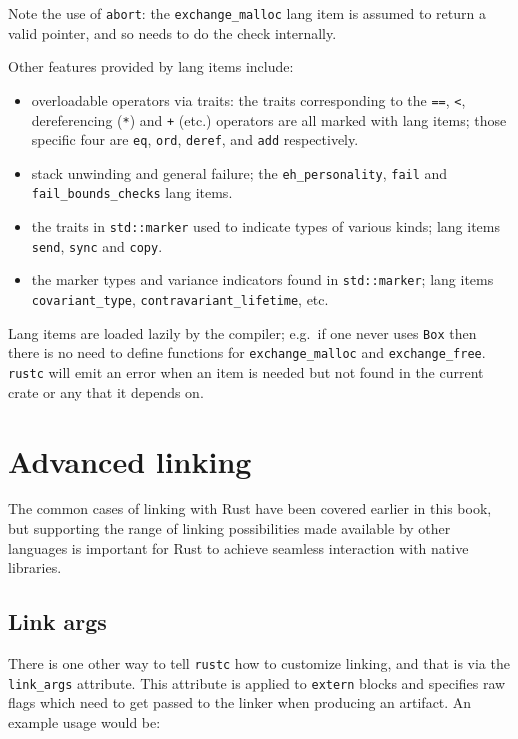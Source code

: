 \documentclass[a4paper,]{book}
\providecommand{\tightlist}{%
  \setlength{\itemsep}{0pt}\setlength{\parskip}{0pt}}
\begin{document}
Note the use of \texttt{abort}: the \texttt{exchange\_malloc} lang item
is assumed to return a valid pointer, and so needs to do the check
internally.

Other features provided by lang items include:

\begin{itemize}
\tightlist
\item
  overloadable operators via traits: the traits corresponding to the
  \texttt{==}, \texttt{\textless{}}, dereferencing (\texttt{*}) and
  \texttt{+} (etc.) operators are all marked with lang items; those
  specific four are \texttt{eq}, \texttt{ord}, \texttt{deref}, and
  \texttt{add} respectively.
\item
  stack unwinding and general failure; the \texttt{eh\_personality},
  \texttt{fail} and \texttt{fail\_bounds\_checks} lang items.
\item
  the traits in \texttt{std::marker} used to indicate types of various
  kinds; lang items \texttt{send}, \texttt{sync} and \texttt{copy}.
\item
  the marker types and variance indicators found in
  \texttt{std::marker}; lang items \texttt{covariant\_type},
  \texttt{contravariant\_lifetime}, etc.
\end{itemize}

Lang items are loaded lazily by the compiler; e.g.~if one never uses
\texttt{Box} then there is no need to define functions for
\texttt{exchange\_malloc} and \texttt{exchange\_free}. \texttt{rustc}
will emit an error when an item is needed but not found in the current
crate or any that it depends on.

\section{Advanced linking}\label{sec--advanced-linking}

The common cases of linking with Rust have been covered earlier in this
book, but supporting the range of linking possibilities made available
by other languages is important for Rust to achieve seamless interaction
with native libraries.

\subsection{Link args}\label{link-args}

There is one other way to tell \texttt{rustc} how to customize linking,
and that is via the \texttt{link\_args} attribute. This attribute is
applied to \texttt{extern} blocks and specifies raw flags which need to
get passed to the linker when producing an artifact. An example usage
would be:
\end{document}
